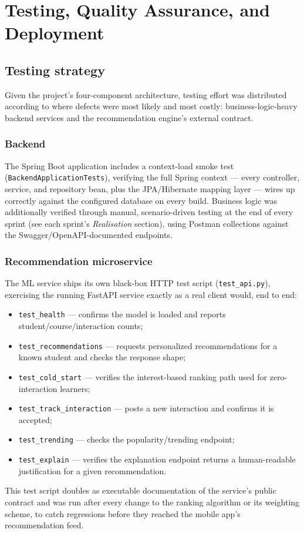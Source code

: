 \documentclass[a4paper,12pt]{report}
\begin{document}
\chapter{Testing, Quality Assurance, and Deployment}
\label{chap:testing}

\section{Testing strategy}
Given the project's four-component architecture, testing effort was
distributed according to where defects were most likely and most costly:
business-logic-heavy backend services and the recommendation engine's
external contract.

\subsection{Backend}
The Spring Boot application includes a context-load smoke test
(\texttt{BackendApplicationTests}), verifying the full Spring context ---
every controller, service, and repository bean, plus the JPA/Hibernate
mapping layer --- wires up correctly against the configured database on
every build. Business logic was additionally verified through manual,
scenario-driven testing at the end of every sprint (see each sprint's
\emph{Realisation} section), using Postman collections against the
Swagger/OpenAPI-documented endpoints.

\subsection{Recommendation microservice}
The ML service ships its own black-box HTTP test script
(\texttt{test\_api.py}), exercising the running FastAPI service exactly as
a real client would, end to end:
\begin{itemize}[leftmargin=*]
  \item \texttt{test\_health} --- confirms the model is loaded and reports
        student/course/interaction counts;
  \item \texttt{test\_recommendations} --- requests personalized
        recommendations for a known student and checks the response
        shape;
  \item \texttt{test\_cold\_start} --- verifies the interest-based ranking
        path used for zero-interaction learners;
  \item \texttt{test\_track\_interaction} --- posts a new interaction and
        confirms it is accepted;
  \item \texttt{test\_trending} --- checks the popularity/trending
        endpoint;
  \item \texttt{test\_explain} --- verifies the explanation endpoint
        returns a human-readable justification for a given
        recommendation.
\end{itemize}
This test script doubles as executable documentation of the service's
public contract and was run after every change to the ranking algorithm
or its weighting scheme, to catch regressions before they reached the
mobile app's recommendation feed.
\end{document}
